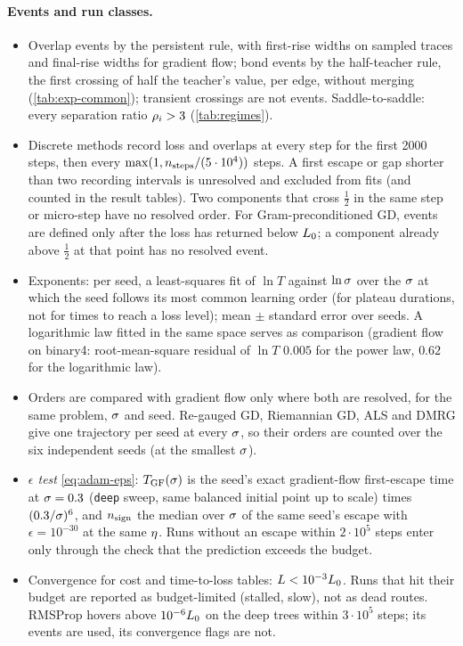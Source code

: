 \paragraph{Events and run classes.}
\begin{itemize}
  \item Overlap events by the persistent rule, with first-rise widths on sampled traces and final-rise widths
    for gradient flow; bond events by the half-teacher rule, the first crossing of half the teacher's value, per
    edge, without merging (\cref{tab:exp-common}); transient crossings are not events. Saddle-to-saddle: every
    separation ratio $\rho_{i}>3$ (\cref{tab:regimes}).
  \item Discrete methods record loss and overlaps at every step for the first 2000 steps, then every
    $\max(1,n_{\rm steps}/(5\cdot10^4))$ steps. A first escape or gap shorter than two recording
    intervals is unresolved and excluded from fits (and counted in the result tables). Two components
    that cross $\frac12$ in the same step or micro-step have no resolved order. For Gram-preconditioned
    GD, events are defined only after the loss has returned below $L_0$; a component already above
    $\frac12$ at that point has no resolved event.
  \item Exponents: per seed, a least-squares fit of $\ln T$ against $\ln\sigma$ over the $\sigma$ at which
    the seed follows its most common learning order (for plateau durations, not for times to reach a
    loss level); mean $\pm$ standard error over seeds. A logarithmic law fitted in the same space
    serves as comparison (gradient flow on binary4: root-mean-square residual of $\ln T$ $0.005$ for
    the power law, $0.62$ for the logarithmic law).
  \item Orders are compared with gradient flow only where both are resolved, for the same problem,
    $\sigma$ and seed. Re-gauged GD, Riemannian GD, ALS and DMRG give one trajectory per seed at every
    $\sigma$, so their orders are counted over the six independent seeds (at the smallest $\sigma$).
  \item \emph{$\epsilon$ test} \eqref{eq:adam-eps}: $T_{\rm GF}(\sigma)$ is the seed's exact
    gradient-flow first-escape time at $\sigma=0.3$ (\texttt{deep} sweep, same balanced initial point
    up to scale) times $(0.3/\sigma)^6$, and $n_{\rm sign}$ the median over $\sigma$ of the same seed's
    escape with $\epsilon=10^{-30}$ at the same $\eta$. Runs without an escape within $2\cdot10^5$ steps
    enter only through the check that the prediction exceeds the budget.
  \item Convergence for cost and time-to-loss tables: $L<10^{-3}L_0$. Runs that hit their budget
    are reported as budget-limited (stalled, slow), not as dead routes. RMSProp hovers above $10^{-6}L_0$ on
    the deep trees within $3\cdot10^5$ steps; its events are used, its convergence flags are not.
\end{itemize}

